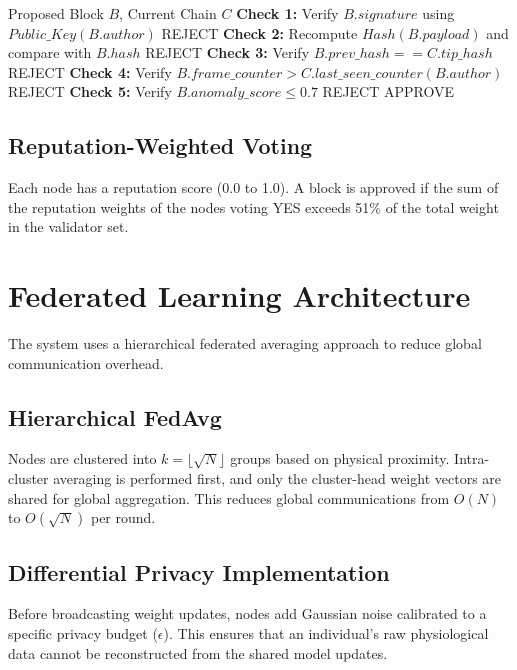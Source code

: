 \begin{algorithm}[H]
\caption{PoA Block Validator Pipeline}
\label{alg:poa_validator}
\begin{algorithmic}[1]
\REQUIRE Proposed Block $B$, Current Chain $C$
\STATE \textbf{Check 1:} Verify $B.signature$ using $Public\_Key(B.author)$ 
 \RETURN REJECT \ENDIF
\STATE \textbf{Check 2:} Recompute $Hash(B.payload)$ and compare with $B.hash$ 
 \RETURN REJECT \ENDIF
\STATE \textbf{Check 3:} Verify $B.prev\_hash == C.tip\_hash$
 \RETURN REJECT \ENDIF
\STATE \textbf{Check 4:} Verify $B.frame\_counter > C.last\_seen\_counter(B.author)$
 \RETURN REJECT \ENDIF
\STATE \textbf{Check 5:} Verify $B.anomaly\_score \leq 0.7$ 
 \RETURN REJECT \ENDIF
\STATE \RETURN APPROVE
\end{algorithmic}
\end{algorithm}

\subsection{Reputation-Weighted Voting}
Each node has a reputation score (0.0 to 1.0). A block is approved if the sum of the reputation weights of the nodes voting YES exceeds 51\% of the total weight in the validator set.

\section{Federated Learning Architecture}

The system uses a hierarchical federated averaging approach to reduce global communication overhead.

\subsection{Hierarchical FedAvg}
Nodes are clustered into $k = \lfloor\sqrt{N}\rfloor$ groups based on physical proximity. Intra-cluster averaging is performed first, and only the cluster-head weight vectors are shared for global aggregation. This reduces global communications from $O(N)$ to $O(\sqrt{N})$ per round.

\subsection{Differential Privacy Implementation}
Before broadcasting weight updates, nodes add Gaussian noise calibrated to a specific privacy budget ($\epsilon$). This ensures that an individual's raw physiological data cannot be reconstructed from the shared model updates.


